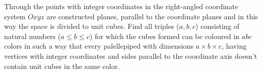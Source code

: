 Through the points with integer coordinates in the right-angled coordinate system $Oxyz$ are constructed planes, parallel to the coordinate planes and in this way the space is divided to unit cubes. Find all triples ($a, b, c$) consisting of natural numbers ($a \le  b \le c$) for which the cubes formed can be coloured in $abc$ colors in such a way that every palellepiped with  dimensions $a \times  b \times c$, having vertices with integer coordinates and sides parallel to the coordinate axis doesn't contain unit cubes in the same color.
